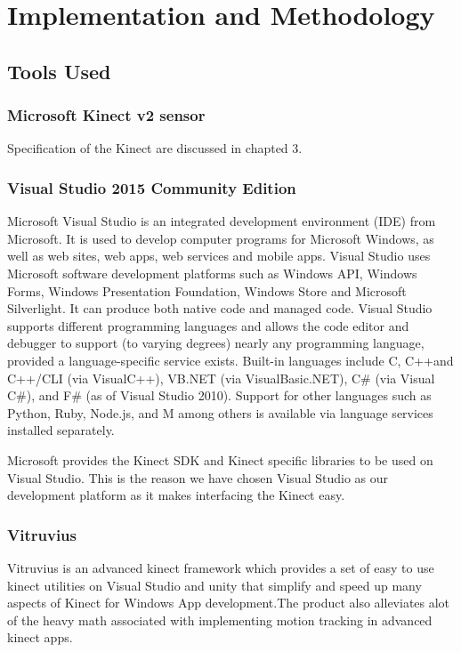 
\chapter{Implementation and Methodology} \label{Implementation and Methodology}

\section{Tools Used } \label{Tools Used }
\subsection{Microsoft Kinect v2 sensor} \label{Microsoft Kinect v2 sensor} 
\noindent Specification of the Kinect are discussed in chapted 3.
\subsection{Visual Studio 2015 Community Edition }\label{Visual Studio 2015 Community Edition }  
\noindent Microsoft Visual Studio is an integrated development environment (IDE) from Microsoft. It is used to develop computer programs for Microsoft Windows, as well as web sites, web apps, web services and mobile apps. Visual Studio uses Microsoft software development platforms such as Windows API, Windows Forms, Windows Presentation Foundation, Windows Store and Microsoft Silverlight. It can produce both native code and managed code. Visual Studio supports different programming languages and allows the code editor and debugger to support (to varying degrees) nearly any programming language, provided a language-specific service exists. Built-in languages include C, C++and C++/CLI (via VisualC++), VB.NET (via VisualBasic.NET), C\# (via Visual C\#), and F\# (as of Visual Studio 2010). Support for other languages such as Python, Ruby, Node.js, and M among others is available via language services installed separately.

\noindent Microsoft provides the Kinect SDK and Kinect specific libraries to be used on Visual Studio. This is the reason we have chosen Visual Studio as our development platform as it makes interfacing the Kinect easy. 

\subsection{Vitruvius }\label{Vitruvius}
\noindent Vitruvius is an advanced kinect framework which provides a set of easy to use kinect utilities on Visual Studio and unity that simplify and speed up many aspects of Kinect for Windows App development.The product also alleviates alot of the heavy math associated with implementing motion tracking in advanced kinect apps.

